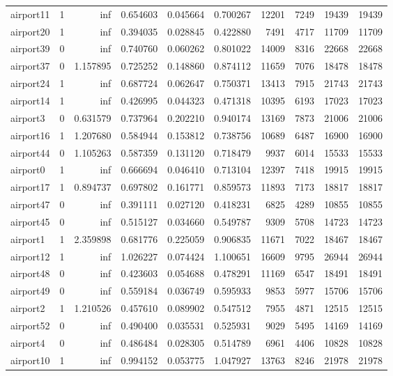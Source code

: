 \begin{longtable}{|l|r|r|r|r|r|r|r|r|r|}
airport11 & 1 & inf & 0.654603 & 0.045664 & 0.700267 & 12201 & 7249 & 19439 & 19439 \\
airport20 & 1 & inf & 0.394035 & 0.028845 & 0.422880 & 7491 & 4717 & 11709 & 11709 \\
airport39 & 0 & inf & 0.740760 & 0.060262 & 0.801022 & 14009 & 8316 & 22668 & 22668 \\
airport37 & 0 & 1.157895 & 0.725252 & 0.148860 & 0.874112 & 11659 & 7076 & 18478 & 18478 \\
airport24 & 1 & inf & 0.687724 & 0.062647 & 0.750371 & 13413 & 7915 & 21743 & 21743 \\
airport14 & 1 & inf & 0.426995 & 0.044323 & 0.471318 & 10395 & 6193 & 17023 & 17023 \\
airport3 & 0 & 0.631579 & 0.737964 & 0.202210 & 0.940174 & 13169 & 7873 & 21006 & 21006 \\
airport16 & 1 & 1.207680 & 0.584944 & 0.153812 & 0.738756 & 10689 & 6487 & 16900 & 16900 \\
airport44 & 0 & 1.105263 & 0.587359 & 0.131120 & 0.718479 & 9937 & 6014 & 15533 & 15533 \\
airport0 & 1 & inf & 0.666694 & 0.046410 & 0.713104 & 12397 & 7418 & 19915 & 19915 \\
airport17 & 1 & 0.894737 & 0.697802 & 0.161771 & 0.859573 & 11893 & 7173 & 18817 & 18817 \\
airport47 & 0 & inf & 0.391111 & 0.027120 & 0.418231 & 6825 & 4289 & 10855 & 10855 \\
airport45 & 0 & inf & 0.515127 & 0.034660 & 0.549787 & 9309 & 5708 & 14723 & 14723 \\
airport1 & 1 & 2.359898 & 0.681776 & 0.225059 & 0.906835 & 11671 & 7022 & 18467 & 18467 \\
airport12 & 1 & inf & 1.026227 & 0.074424 & 1.100651 & 16609 & 9795 & 26944 & 26944 \\
airport48 & 0 & inf & 0.423603 & 0.054688 & 0.478291 & 11169 & 6547 & 18491 & 18491 \\
airport49 & 0 & inf & 0.559184 & 0.036749 & 0.595933 & 9853 & 5977 & 15706 & 15706 \\
airport2 & 1 & 1.210526 & 0.457610 & 0.089902 & 0.547512 & 7955 & 4871 & 12515 & 12515 \\
airport52 & 0 & inf & 0.490400 & 0.035531 & 0.525931 & 9029 & 5495 & 14169 & 14169 \\
airport4 & 0 & inf & 0.486484 & 0.028305 & 0.514789 & 6961 & 4406 & 10828 & 10828 \\
airport10 & 1 & inf & 0.994152 & 0.053775 & 1.047927 & 13763 & 8246 & 21978 & 21978 \\

\end{longtable}
